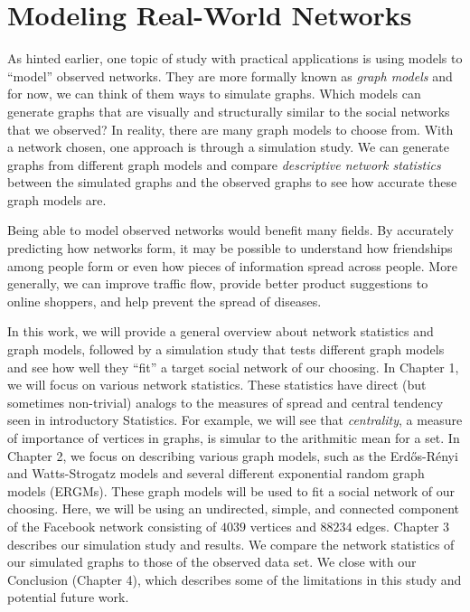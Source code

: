 \documentclass[12pt,twoside]{amherstthesis}
\begin{document}
  \section{Modeling Real-World
  Networks}\label{modeling-real-world-networks}
  
  As hinted earlier, one topic of study with practical applications is
  using models to ``model'' observed networks. They are more formally
  known as \emph{graph models} and for now, we can think of them ways to
  simulate graphs. Which models can generate graphs that are visually and
  structurally similar to the social networks that we observed? In
  reality, there are many graph models to choose from. With a network
  chosen, one approach is through a simulation study. We can generate
  graphs from different graph models and compare \emph{descriptive network
  statistics} between the simulated graphs and the observed graphs to see
  how accurate these graph models are.
  
  Being able to model observed networks would benefit many fields. By
  accurately predicting how networks form, it may be possible to
  understand how friendships among people form or even how pieces of
  information spread across people. More generally, we can improve traffic
  flow, provide better product suggestions to online shoppers, and help
  prevent the spread of diseases.
  
  In this work, we will provide a general overview about network
  statistics and graph models, followed by a simulation study that tests
  different graph models and see how well they ``fit'' a target social
  network of our choosing. In Chapter 1, we will focus on various network
  statistics. These statistics have direct (but sometimes non-trivial)
  analogs to the measures of spread and central tendency seen in
  introductory Statistics. For example, we will see that
  \emph{centrality}, a measure of importance of vertices in graphs, is
  simular to the arithmitic mean for a set. In Chapter 2, we focus on
  describing various graph models, such as the Erdős-Rényi and
  Watts-Strogatz models and several different exponential random graph
  models (ERGMs). These graph models will be used to fit a social network
  of our choosing. Here, we will be using an undirected, simple, and
  connected component of the Facebook network consisting of \(4039\)
  vertices and \(88234\) edges. Chapter 3 describes our simulation study
  and results. We compare the network statistics of our simulated graphs
  to those of the observed data set. We close with our Conclusion (Chapter
  4), which describes some of the limitations in this study and potential
  future work.
  
\end{document}

